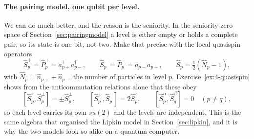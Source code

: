 \paragraph{The pairing model, one qubit per level.}
We can do much better, and the reason is the seniority.  In the
seniority-zero space of Section~\ref{sec:pairingmodel} a level is either
empty or holds a complete pair, so its state is one bit, not two.  Make that
precise with the local quasispin operators
\begin{equation}
  \hat{S}^{+}_p = \hat{P}^{+}_p = a^{\dagger}_{p+}a^{\dagger}_{p-},
  \qquad
  \hat{S}^{-}_p = \hat{P}^{-}_p = a_{p-}a_{p+},
  \qquad
  \hat{S}^{z}_p = \tfrac12\left(\hat{N}_p-1\right),
  \label{eq:4-quasispinpair}
\end{equation}
with $\hat{N}_p=\hat{n}_{p+}+\hat{n}_{p-}$ the number of particles in level
$p$.  Exercise~\ref{ex:4-quasispin} shows from the anticommutation relations
alone that these obey
\begin{equation}
  \left[\hat{S}^{z}_p,\hat{S}^{\pm}_p\right] = \pm\hat{S}^{\pm}_p,
  \qquad
  \left[\hat{S}^{+}_p,\hat{S}^{-}_p\right] = 2\hat{S}^{z}_p,
  \qquad
  \left[\hat{S}^{\alpha}_p,\hat{S}^{\beta}_q\right] = 0
  \quad (p\ne q),
  \label{eq:4-quasispinalgebra}
\end{equation}
so each level carries its own $su(2)$ and the levels are independent.  This is
the same algebra that organised the Lipkin model in
Section~\ref{sec:lipkin}, and it is why the two models look so alike on a
quantum computer.


